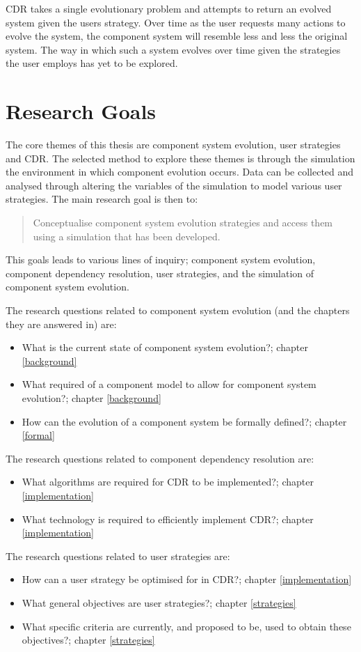 CDR takes a single evolutionary problem and attempts to return an evolved system given the users strategy.
Over time as the user requests many actions to evolve the system, the component system will resemble less and less the original system.
The way in which such a system evolves over time given the strategies the user employs has yet to be explored. 

\section{Research Goals}
The core themes of this thesis are component system evolution, user strategies and CDR.
The selected method to explore these themes is through the simulation the environment in which component evolution occurs.
Data can be collected and analysed through altering the variables of the simulation to model various user strategies.
The main research goal is then to:
\begin{quote}
Conceptualise component system evolution strategies and access them using a simulation that has been developed.
\end{quote}

This goals leads to various lines of inquiry; component system evolution, component dependency resolution, user strategies, and the simulation of component system evolution.

The research questions related to component system evolution (and the chapters they are answered in) are:
\begin{itemize}
	\item What is the current state of component system evolution?; chapter \ref{background}
	\item What required of a component model to allow for component system evolution?; chapter \ref{background}
	\item How can the evolution of a component system be formally defined?; chapter \ref{formal}
\end{itemize}

The research questions related to component dependency resolution are:
\begin{itemize}
  \item What algorithms are required for CDR to be implemented?; chapter \ref{implementation}
  \item What technology is required to efficiently implement CDR?; chapter \ref{implementation}
\end{itemize}

The research questions related to user strategies are: 
\begin{itemize}
	\item How can a user strategy be optimised for in CDR?; chapter \ref{implementation}
	\item What general objectives are user strategies?;  chapter \ref{strategies}
	\item What specific criteria are currently, and proposed to be, used to obtain these objectives?; chapter \ref{strategies}
\end{itemize}

